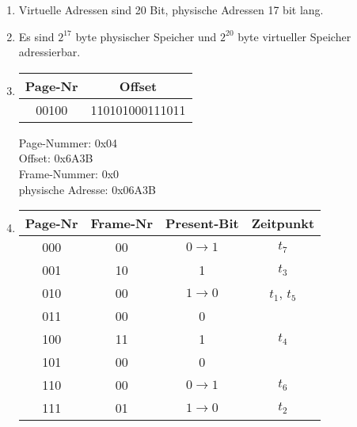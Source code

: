 \documentclass[a4paper, 12pt, margins=2cm]{homework}
\begin{document}
\begin{solution}
  \begin{enumerate}[label=(\alph*)]\itemsep0pt
    \item Virtuelle Adressen sind 20 Bit, physische Adressen 17 bit lang.
    \item Es sind $2^{17}$ byte physischer Speicher und $2^{20}$ byte 
          virtueller Speicher adressierbar.
    \item \hfill 
      \begin{center}
        \begin{tabular}{c|c}
          Page-Nr & Offset          \\ \hline
          00100   & 110101000111011
        \end{tabular}
      \end{center}
      Page-Nummer: 0x04\\
      Offset: 0x6A3B\\
      Frame-Nummer: 0x0\\
      physische Adresse: 0x06A3B
    \newpage
    \item \hfill
      \begin{center}
        \begin{tabular}{|c|c|c|c|}
          \hline
          Page-Nr & Frame-Nr & Present-Bit      & Zeitpunkt    \\ \hline \hline
          000     & 00       & $0\rightarrow 1$ & $t_7$        \\ \hline
          001     & 10       & 1                & $t_3$        \\ \hline
          010     & 00       & $1\rightarrow 0$ & $t_1$, $t_5$ \\ \hline
          011     & 00       & 0                &              \\ \hline
          100     & 11       & 1                & $t_4$        \\ \hline
          101     & 00       & 0                &              \\ \hline
          110     & 00       & $0\rightarrow 1$ & $t_6$        \\ \hline
          111     & 01       & $1\rightarrow 0$ & $t_2$        \\ \hline
        \end{tabular}
      \end{center}
  \end{enumerate}
\end{solution}
\end{document}
